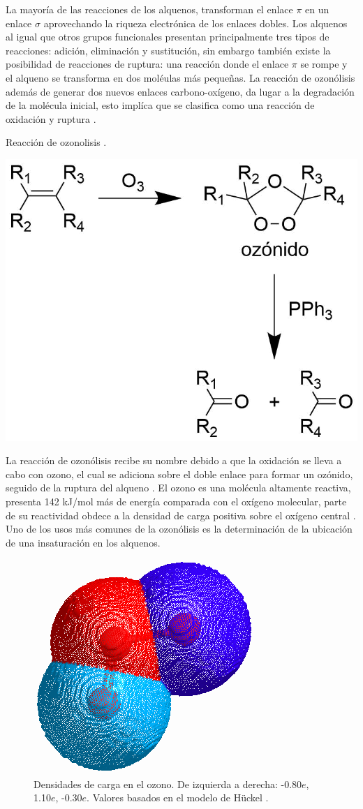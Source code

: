 \documentclass[fleqn,10pt]{SelfArx}
\begin{document}
La mayor\'ia de las reacciones de los alquenos, transforman el enlace $\pi$ en un enlace $\sigma$ aprovechando la riqueza electr\'onica de los enlaces dobles. Los alquenos al igual que otros grupos funcionales presentan principalmente tres tipos de reacciones: adici\'on, eliminaci\'on y sustituci\'on, sin embargo tambi\'en existe la posibilidad de reacciones de ruptura: una reacci\'on donde el enlace $\pi$ se rompe y el alqueno se transforma en dos mol\'eulas m\'as peque\~nas. La reacci\'on de ozon\'olisis adem\'as de generar dos nuevos enlaces carbono-ox\'igeno, da lugar a la degradaci\'on de la mol\'ecula inicial, esto impl\'ica que se clasifica como una reacci\'on de oxidaci\'on y ruptura \cite{Wade2013}\cite{Morrison2002}.
\begin{scheme}[h]
	\centering
	\caption{Reacci\'on de ozonolisis \cite{Wade2013}.}
	\includegraphics[width=0.7\linewidth]{structures/ozonolisis.png}
\end{scheme}

La reacci\'on de ozon\'olisis recibe su nombre debido a que la oxidaci\'on se lleva a cabo con ozono, el cual se adiciona sobre el doble enlace para formar un oz\'onido, seguido de la ruptura del alqueno \cite{Morrison2002}. El ozono es una mol\'ecula altamente reactiva, presenta 142 kJ/mol m\'as de energ\'ia comparada con el ox\'igeno molecular, parte de su reactividad obdece a la densidad de carga positiva sobre el ox\'igeno central \cite{Wade2013}. Uno de los usos m\'as comunes de la ozon\'olisis es la determinaci\'on de la ubicaci\'on de una insaturaci\'on en los alquenos.
\begin{figure}[h]
	\centering
	\includegraphics[width=0.4\linewidth]{structures/ozone.png}
	\caption{Densidades de carga en el ozono. De izquierda a derecha: -0.80$e$, 1.10$e$, -0.30$e$. Valores basados en el modelo de H\"uckel \cite{PerkinElmer}.}
\end{figure}
\end{document}
